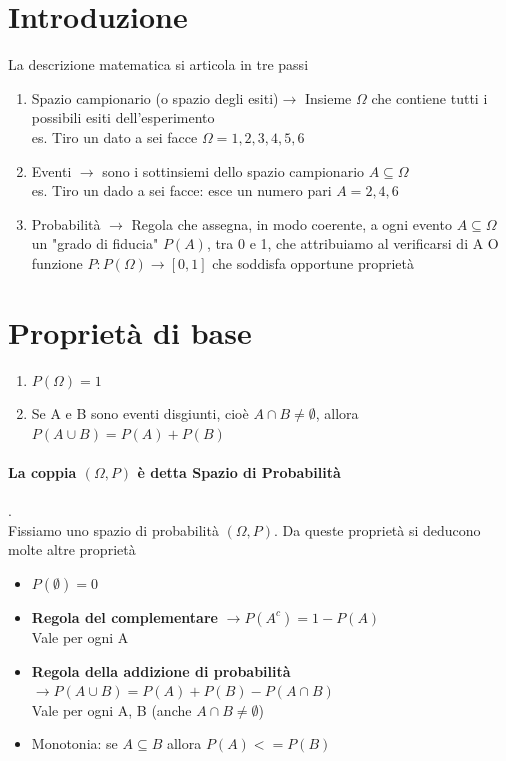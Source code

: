 \documentclass[12pt, a4paper, openany]{book}
\begin{document}
\section{Introduzione}
La descrizione matematica si articola in tre passi
\begin{enumerate}
    \item Spazio campionario (o spazio degli esiti)$\to$ Insieme $\Omega$ che contiene tutti i possibili esiti dell'esperimento \\ es. Tiro un dato a sei facce $\Omega = {1, 2, 3, 4, 5, 6}$
    \item Eventi $\to$ sono i sottinsiemi dello spazio campionario $A \subseteq \Omega$ \\ es. Tiro un dado a sei facce: esce un numero pari $A = {2, 4, 6}$
    \item Probabilità $\to$ Regola che assegna, in modo coerente, a ogni evento $A \subseteq \Omega$ un "grado di fiducia" $P(A)$, tra 0 e 1, che attribuiamo al verificarsi di A
    O funzione $P: P(\Omega) \to [0, 1]$ che soddisfa opportune proprietà
\end{enumerate}
\section{Proprietà di base} 
\begin{enumerate}
    \item $P(\Omega) = 1$
    \item Se A e B sono eventi disgiunti, cioè $A \cap B \neq \emptyset$, allora \\ $P (A \cup B) = P(A) + P(B)$
\end{enumerate}
\paragraph{La coppia $(\Omega, P)$ è detta \textbf{Spazio di Probabilità}}.
\\ Fissiamo uno spazio di probabilità $(\Omega, P)$.
Da queste proprietà si deducono molte altre proprietà
\begin{itemize}
    \item $P(\emptyset) = 0$
    \item \textbf{Regola del complementare} $\to P(A^c) = 1 - P(A)$ \\ Vale per ogni A
    \item \textbf{Regola della addizione di probabilità} $\to P(A \cup B) = P(A) + P(B) - P(A \cap B)$ 
    \\ Vale per ogni A, B (anche $A \cap B \neq \emptyset$)
    \item Monotonia: se $A \subseteq B$ allora $P(A) <= P(B)$
\end{itemize}
\end{document}
